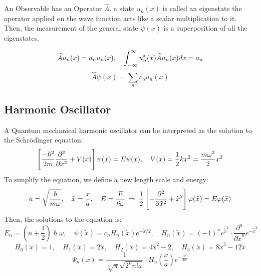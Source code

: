 \documentclass{article}
\begin{document}
An Observable has an Operator $\hat{A}$. a state $u_n(x)$ is called an eigenstate the operator applied on the wave function acts like a scalar multiplication to it. Then, the measurement of the general state $\psi(x)$ is a superposition of all the eigenstates.

$$\widehat{A} u_n(x) = a_n u_n(x), \quad \int_{-\infty}^{\infty} u^\ast_n(x) \widehat{A} u_n(x) dx = a_n$$
$$\hat{A} \psi(x) = \sum_n c_n u_n(x)$$

\subsection{Harmonic Oscillator}

A Quantum mechanical harmonic oscillator can be interpreted as the solution to the Schrödinger equation:
$$\left[ \frac{-\hslash^2}{2m} \frac{\partial^2 }{\partial x ^2}  + V(x) \right] \psi(x) = E \psi(x), \quad V(x) = \frac{1}{2} k x^2 = \frac{m \omega^2}{2} x^2$$
To simplify the equation, we define a new length scale and energy:
$$a = \sqrt{\frac{\hslash}{m \omega}}, \quad \tilde{x} = \frac{x}{a}, \quad \tilde{E} = \frac{E}{\hslash \omega} \, \Rightarrow \, \frac{1}{2} \left[-\frac{\partial^2 }{\partial \tilde{x} ^2} + \tilde{x}^2\right] \varphi(\tilde{x}) = \tilde{E} \varphi(\tilde{x})$$
Then, the solutions to the equation is:
$$E_n = \left(n + \frac{1}{2}\right) \hslash \omega, \quad \psi(\tilde{x}) = c_n H_n(\tilde{x}) e^{-
\tilde{x}/2}, \quad H_n(\tilde{x}) = (-1)^n e^{\tilde{x}^2} \cdot \frac{\partial^n}{\partial \tilde{x}^n} e^{-\tilde{x}^2}$$
$$H_0(\tilde{x}) = 1, \quad H_1(\tilde{x}) = 2 \tilde{x}, \quad H_2(\tilde{x}) = 4 \tilde{x}^2 - 2, \quad H_3(\tilde{x}) =8 \tilde{x}^3 - 12\tilde{x}$$
$$\Psi_n(x) = \frac{1}{\sqrt[4]{\pi} \sqrt{2^n n! a}} \cdot H_n\left(\frac{x}{a}\right) e^{-\frac{x^2}{2a^2}}$$

\begin{center}
\end{center}
\end{document}
